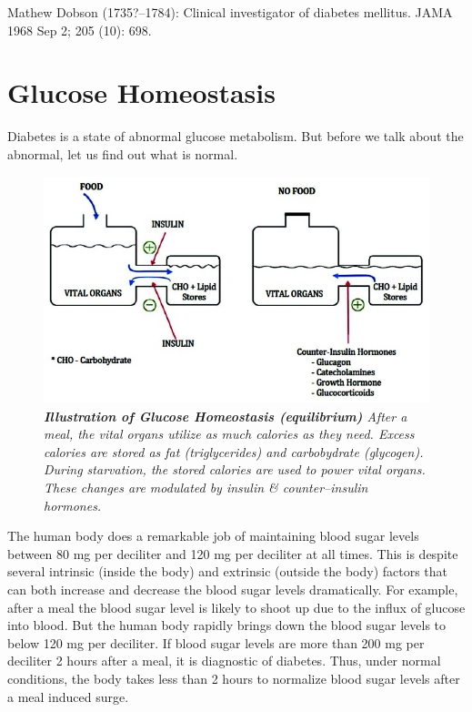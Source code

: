 \begin{thebibliography}{99}
 Mathew Dobson (1735?–1784): Clinical investigator of diabetes mellitus. JAMA 1968 Sep 2; 205 (10): 698.
\end{thebibliography}


\chapter{Glucose Homeostasis}\label{chap2}

Diabetes is a state of abnormal glucose metabolism. But before we talk about the abnormal, let us find out what is normal.

\vskip 10pt

\begin{figure}[h]
\centering
\includegraphics[scale=2.5]{images/017.jpg}\\
\textit{\textbf{Illustration of Glucose Homeostasis (equilibrium)} After a meal, the vital organs utilize as much calories as they need. Excess calories are stored as fat (triglycerides) and carbobydrate (glycogen). During starvation, the stored calories are used to power vital organs. These changes are modulated by insulin \& counter–insulin hormones.}
\end{figure}

\vskip 9pt
The human body does a remarkable job of maintaining blood sugar levels between 80 mg per deciliter and 120 mg per deciliter at all times.
 This is despite several intrinsic (inside the body) and extrinsic (outside the body) factors that can both increase and decrease the blood sugar levels dramatically. For example, after a meal the blood sugar level is likely to shoot up due to the influx of glucose into blood. But the human body rapidly brings down the blood sugar levels to below 120 mg per deciliter. If blood sugar levels are more than 200 mg per deciliter 2 hours after a meal, it is diagnostic of diabetes. Thus, under normal conditions, the body takes less than 2 hours to normalize blood sugar levels after a meal induced surge.

